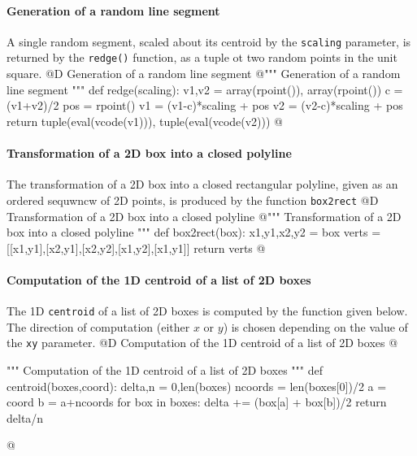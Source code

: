 \documentclass[11pt,oneside]{article}    %
\begin{document}
\paragraph{Generation of a random line segment}
A single random segment, scaled about its centroid by the \texttt{scaling} parameter, is returned by the \texttt{redge()} function, as a tuple ot two random points in the unit square.
@D Generation of a random line segment
@{""" Generation of a random line segment """
def redge(scaling):
    v1,v2 = array(rpoint()), array(rpoint())
    c = (v1+v2)/2
    pos = rpoint()
    v1 = (v1-c)*scaling + pos
    v2 = (v2-c)*scaling + pos
    return tuple(eval(vcode(v1))), tuple(eval(vcode(v2)))
@}
    
\paragraph{Transformation of a 2D box into a closed polyline}
The transformation of a 2D box into a closed rectangular polyline, given as an ordered sequwncw of 2D points, is produced by the function \texttt{box2rect}
@D Transformation of a 2D box into a closed polyline
@{""" Transformation of a 2D box into a closed polyline """    
def box2rect(box):
    x1,y1,x2,y2 = box
    verts = [[x1,y1],[x2,y1],[x2,y2],[x1,y2],[x1,y1]]
    return verts
@}
    
\paragraph{Computation of the 1D centroid of a list of 2D boxes}
The 1D \texttt{centroid} of a list of 2D boxes is computed by the function given below.
The direction of computation (either $x$ or $y$) is chosen depending on the value of the \texttt{xy} parameter. 
@D Computation of the 1D centroid of a list of 2D boxes
@{""" Computation of the 1D centroid of a list of 2D boxes """    
def centroid(boxes,coord):
    delta,n = 0,len(boxes)
    ncoords = len(boxes[0])/2
    a = coord%
    b = a+ncoords
    for box in boxes:
        delta += (box[a] + box[b])/2
    return delta/n

@}
\end{document}
